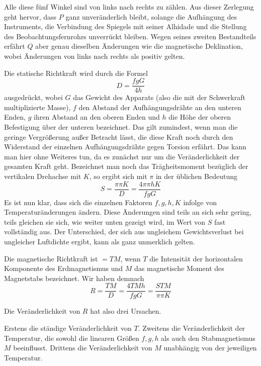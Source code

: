 Alle diese fünf Winkel sind von links nach rechts zu zählen. Aus dieser Zerlegung geht hervor, dass $P$ ganz unveränderlich bleibt, solange die Aufhängung des Instruments, die Verbindung des Spiegels mit seiner Alhidade und die Stellung des Beobachtungsfernrohrs unverrückt bleiben. Wegen seines zweiten Bestandteils erfährt $Q$ aber genau dieselben Änderungen wie die magnetische Deklination, wobei Änderungen von links nach rechts als positiv gelten.

Die statische Richtkraft wird durch die Formel
\[
D=\frac{fgG}{4h}
\]
ausgedrückt, wobei $G$ das Gewicht des Apparats (also die mit der Schwerkraft multiplizierte Masse), $f$ den Abstand der Aufhängungsdrähte an den unteren Enden, $g$ ihren Abstand an den oberen Enden und $h$ die Höhe der oberen Befestigung über der unteren bezeichnet. Das gilt zumindest, wenn man die geringe Vergrößerung außer Betracht lässt, die diese Kraft noch durch den Widerstand der einzelnen Aufhängungsdrähte gegen Torsion erfährt. Das kann man hier ohne Weiteres tun, da es zunächst nur um die Veränderlichkeit der gesamten Kraft geht. Bezeichnet man noch das Trägheitsmoment bezüglich der vertikalen Drehachse mit $K$, so ergibt sich mit $\pi$ in der üblichen Bedeutung
\[
S=\frac{\pi\pi K}{D}=\frac{4\pi\pi hK}{fgG}
\]
Es ist nun klar, dass sich die einzelnen Faktoren $f,g,h,K$ infolge von Temperaturänderungen ändern. Diese Änderungen sind teils an sich sehr gering, teils gleichen sie sich, wie weiter unten gezeigt wird, im Wert von $S$ fast vollständig aus. Der Unterschied, der sich aus ungleichem Gewichtsverlust bei ungleicher Luftdichte ergibt, kann als ganz unmerklich gelten.

Die magnetische Richtkraft ist $=TM$, wenn $T$ die Intensität der horizontalen Komponente des Erdmagnetismus und $M$ das magnetische Moment des Magnetstabs bezeichnet. Wir haben demnach
\[
R=\frac{TM}{D}=\frac{4TMh}{fgG}=\frac{STM}{\pi\pi K}
\]

Die Veränderlichkeit von $R$ hat also drei Ursachen.

Erstens die ständige Veränderlichkeit von $T$. Zweitens die Veränderlichkeit der Temperatur, die sowohl die linearen Größen $f,g,h$ als auch den Stabmagnetismus $M$ beeinflusst. Drittens die Veränderlichkeit von $M$ unabhängig von der jeweiligen Temperatur.

